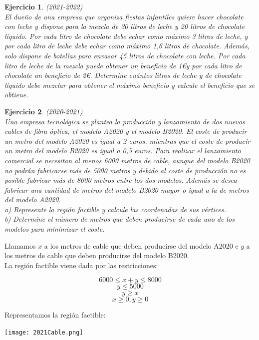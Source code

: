 \documentclass[12pt, a4paper]{amsart}
\newtheorem{ejer}{Ejercicio}
\newcommand{\s}{\color[rgb]{0,0,0.5}}
\begin{document}
\begin{ejer}\em (2021-2022)\\
El dueño de una empresa que organiza fiestas infantiles quiere hacer chocolate con leche y dispone para la mezcla de 30 litros de leche y 20 litros de chocolate líquido. Por cada litro de chocolate debe echar como máximo 3 litros de leche, y por cada litro de leche debe echar como máximo 1,6 litros de chocolate. Además, solo dispone de botellas para envasar 45 litros de chocolate con leche. Por cada litro de leche de la mezcla puede obtener un beneficio de 1\euro y por cada litro de chocolate un beneficio de 2\euro. Determine cuántos litros de leche y de chocolate líquido debe mezclar para obtener el máximo beneficio y calcule el beneficio que se obtiene.
\end{ejer}

\begin{ejer}\em (2020-2021)\\
Una empresa tecnológica se plantea la producción y lanzamiento de dos nuevos cables de fibra óptica, el modelo A2020 y el modelo B2020. El coste de producir un metro del modelo A2020 es igual a 2 euros, mientras que el coste de producir un metro del modelo B2020 es igual a 0,5 euros. Para realizar el lanzamiento comercial se necesitan al menos 6000 metros de cable, aunque del modelo B2020 no podrán fabricarse más de 5000 metros y debido al coste de producción no es posible fabricar más de 8000 metros entre los dos modelos. Además se desea fabricar una cantidad de metros del modelo B2020 mayor o igual a la de metros del modelo A2020.\\
a) Represente la región factible y calcule las coordenadas de sus vértices.\\
b) Determine el número de metros que deben producirse de cada uno de los modelos para minimizar el coste.
\end{ejer}

\newpage


\s
Llamamos $x$ a los metros de cable que deben producirse del modelo A2020 e $y$ a los metros de cable que deben producirse del modelo B2020.\\

La región factible viene dada por las restricciones:

\[6000\leqslant x+y \leqslant 8000\]
\[y\leqslant 5000\]
\[y\geqslant x\]
\[x\geqslant 0, y\geqslant 0\]

Representamos la región factible:
\begin{center}
\texttt{[image: 2021Cable.png]}
\end{center}
\end{document}
